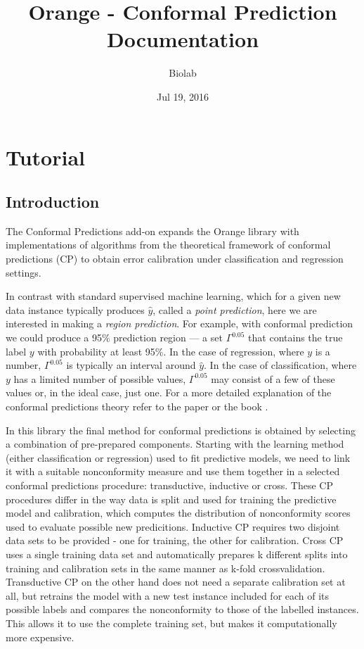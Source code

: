 \documentclass[letterpaper,10pt,english]{sphinxmanual}
\title{Orange - Conformal Prediction Documentation}
\date{Jul 19, 2016}
\author{Biolab}
\begin{document}
\maketitle
\tableofcontents
{}\label{index::doc}



\chapter{Tutorial}
\label{tutorial:welcome-to-orange-conformal-prediction-s-documentation}\label{tutorial:tutorial}\label{tutorial::doc}

\section{Introduction}
\label{tutorial:introduction}
The Conformal Predictions add-on expands the Orange library with
implementations of algorithms from the theoretical framework of conformal
predictions (CP) to obtain error calibration under classification and
regression settings.

In contrast with standard supervised machine learning, which for a given new
data instance typically produces \(\hat{y}\), called a \emph{point prediction}, here we are
interested in making a \emph{region prediction}. For example, with conformal
prediction we could produce a 95\% prediction region --- a set \(\Gamma^{0.05}\)
that contains the true label \(y\) with probability at least 95\%.  In the case of
regression, where \(y\) is a number, \(\Gamma^{0.05}\) is typically an interval around \(\hat{y}\).
In the case of classification, where \(y\) has a limited number of possible values,
\(\Gamma^{0.05}\) may consist of a few of these values or, in the ideal case, just one.
For a more detailed explanation of the conformal predictions theory refer to the paper \label{tutorial:id1}{\hyperref[tutorial:vovk08]{\crossref{{[}Vovk08{]}}}}
or the book \label{tutorial:id2}{\hyperref[tutorial:shafer05]{\crossref{{[}Shafer05{]}}}}.

In this library the final method for conformal predictions is obtained by
selecting a combination of pre-prepared components.  Starting with the learning
method (either classification or regression) used to fit predictive models, we
need to link it with a suitable nonconformity measure and use them together in
a selected conformal predictions procedure: transductive, inductive or cross.
These CP procedures differ in the way data is split and used for training the
predictive model and calibration, which computes the distribution of
nonconformity scores used to evaluate possible new predicitions. Inductive CP
requires two disjoint data sets to be provided - one for training, the other
for calibration. Cross CP uses a single training data set and automatically
prepares k different splits into training and calibration sets in the same
manner as k-fold crossvalidation. Transductive CP on the other hand does not
need a separate calibration set at all, but retrains the model with a new test
instance included for each of its possible labels and compares the
nonconformity to those of the labelled instances. This allows it to use the
complete training set, but makes it computationally more expensive.
\end{document}
